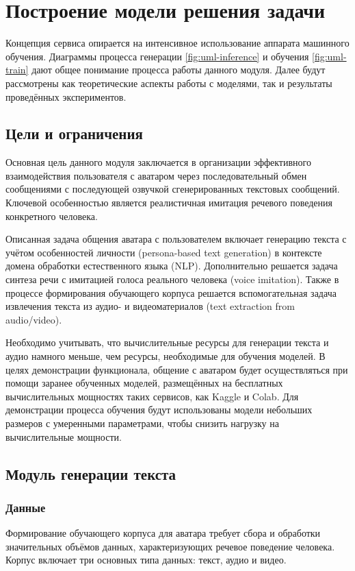 \chapter{Построение модели решения задачи} 
Концепция сервиса опирается на интенсивное использование аппарата машинного обучения. Диаграммы процесса генерации \ref{fig:uml-inference} и обучения \ref{fig:uml-train} дают общее понимание процесса работы данного модуля. Далее будут рассмотрены как теоретические аспекты работы с моделями, так и результаты проведённых экспериментов.

\section{Цели и ограничения}
Основная цель данного модуля заключается в организации эффективного взаимодействия пользователя с аватаром через последовательный обмен сообщениями с последующей озвучкой сгенерированных текстовых сообщений. Ключевой особенностью является реалистичная имитация речевого поведения конкретного человека.

Описанная задача общения аватара с пользователем включает генерацию текста с учётом особенностей личности (persona-based text generation) в контексте домена обработки естественного языка (NLP). Дополнительно решается задача синтеза речи с имитацией голоса реального человека (voice imitation). Также в процессе формирования обучающего корпуса решается вспомогательная задача извлечения текста из аудио- и видеоматериалов (text extraction from audio/video).

Необходимо учитывать, что вычислительные ресурсы для генерации текста и аудио намного меньше, чем ресурсы, необходимые для обучения моделей. В целях демонстрации функционала, общение с аватаром будет осуществляться при помощи заранее обученных моделей, размещённых на бесплатных вычислительных мощностях таких сервисов, как Kaggle и Colab. Для демонстрации процесса обучения будут использованы модели небольших размеров с умеренными параметрами, чтобы снизить нагрузку на вычислительные мощности.


\section{Модуль генерации текста}
\subsection{Данные}
Формирование обучающего корпуса для аватара требует сбора и обработки значительных объёмов данных, характеризующих речевое поведение человека. Корпус включает три основных типа данных: текст, аудио и видео.

